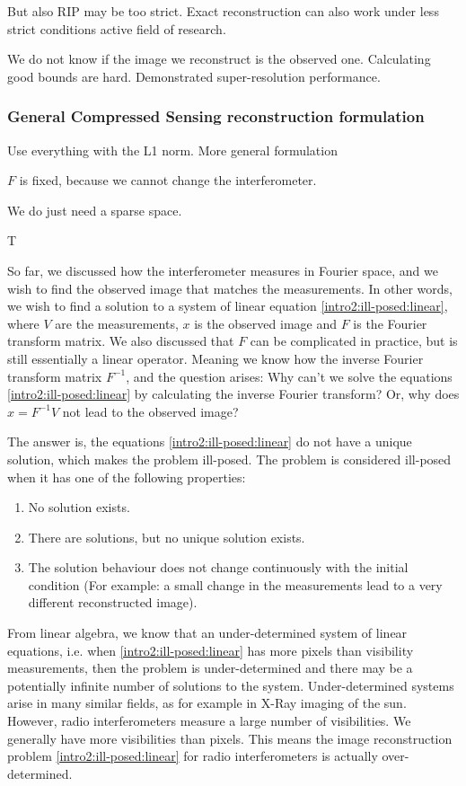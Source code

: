 But also RIP may be too strict. Exact reconstruction can also work under less strict conditions\cite{candes2011probabilistic} active field of research.

We do not know if the image we reconstruct is the observed one. Calculating good bounds are hard. 
Demonstrated super-resolution performance.


\subsubsection{General Compressed Sensing reconstruction formulation}
Use everything with the L1 norm. More general formulation

$F$ is fixed, because we cannot change the interferometer.

We do just need a sparse space.





T 

So far, we discussed how the interferometer measures in Fourier space, and we wish to find the observed image that matches the measurements. In other words, we wish to find a solution to a system of linear equation \eqref{intro2:ill-posed:linear}, where $V$ are the measurements, $x$ is the observed image and $F$ is the Fourier transform matrix. We also discussed that $F$ can be complicated in practice, but is still essentially a linear operator. Meaning we know how the inverse Fourier transform matrix $F^{-1}$, and the question arises: Why can't we solve the equations \eqref{intro2:ill-posed:linear} by calculating the inverse Fourier transform? Or, why does $x = F^{-1} V$ not lead to the observed image?



The answer is, the equations \eqref{intro2:ill-posed:linear} do not have a unique solution, which makes the problem ill-posed. The problem is considered ill-posed when it has one of the following properties:
\begin{enumerate}
	\item No solution exists.
	\item There are solutions, but no unique solution exists.
	\item The solution behaviour does not change continuously with the initial condition (For example: a small change in the measurements lead to a very different reconstructed image).
\end{enumerate}
From linear algebra, we know that an under-determined system of linear equations, i.e. when \eqref{intro2:ill-posed:linear} has more pixels than visibility measurements, then the problem is under-determined and there may be a potentially infinite number of solutions to the system. Under-determined systems arise in many similar fields, as for example in X-Ray imaging of the sun\cite{felix2017compressed}. However, radio interferometers measure a large number of visibilities. We generally have more visibilities than pixels. This means the image reconstruction problem \eqref{intro2:ill-posed:linear} for radio interferometers is actually over-determined.

